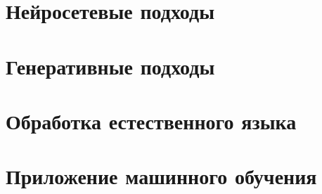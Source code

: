 
\section{Нейросетевые подходы}



\section{Генеративные подходы}



\section{Обработка естественного языка}



\section{Приложение машинного обучения}



